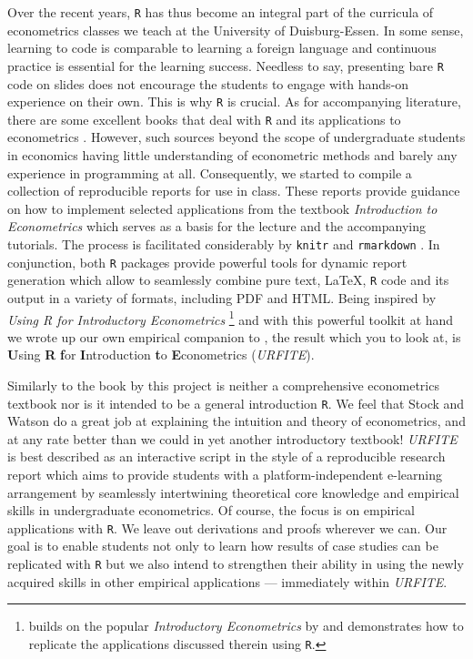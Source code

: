 \documentclass[]{book}
\let\rmarkdownfootnote\footnote%
\def\footnote{\protect\rmarkdownfootnote}
\theoremstyle{definition}
\theoremstyle{definition}
\theoremstyle{definition}
\theoremstyle{remark}
\begin{document}
Over the recent years, \texttt{R} has thus become an integral part of
the curricula of econometrics classes we teach at the University of
Duisburg-Essen. In some sense, learning to code is comparable to
learning a foreign language and continuous practice is essential for the
learning success. Needless to say, presenting bare \texttt{R} code on
slides does not encourage the students to engage with hands-on
experience on their own. This is why \texttt{R} is crucial. As for
accompanying literature, there are some excellent books that deal with
\texttt{R} and its applications to econometrics
\citep[e.g.][]{kleiber2008}. However, such sources beyond the scope of
undergraduate students in economics having little understanding of
econometric methods and barely any experience in programming at all.
Consequently, we started to compile a collection of reproducible reports
for use in class. These reports provide guidance on how to implement
selected applications from the textbook \emph{Introduction to
Econometrics} \citep{stock2015} which serves as a basis for the lecture
and the accompanying tutorials. The process is facilitated considerably
by \texttt{knitr} \citep{R-knitr} and \texttt{rmarkdown}
\citep{R-rmarkdown}. In conjunction, both \texttt{R} packages provide
powerful tools for dynamic report generation which allow to seamlessly
combine pure text, LaTeX, \texttt{R} code and its output in a variety of
formats, including PDF and HTML. Being inspired by \emph{Using R for
Introductory Econometrics} \citep{heiss2016}\footnote{\citet{heiss2016}
  builds on the popular \emph{Introductory Econometrics} by
  \citet{wooldridge2016} and demonstrates how to replicate the
  applications discussed therein using \texttt{R}.} and with this
powerful toolkit at hand we wrote up our own empirical companion to
\citet{stock2015}, the result which you to look at, is \textbf{U}sing
\textbf{R} \textbf{f}or \textbf{I}ntroduction \textbf{t}o
\textbf{E}conometrics (\emph{URFITE}).

Similarly to the book by \citet{heiss2016} this project is neither a
comprehensive econometrics textbook nor is it intended to be a general
introduction \texttt{R}. We feel that Stock and Watson do a great job at
explaining the intuition and theory of econometrics, and at any rate
better than we could in yet another introductory textbook! \emph{URFITE}
is best described as an interactive script in the style of a
reproducible research report which aims to provide students with a
platform-independent e-learning arrangement by seamlessly intertwining
theoretical core knowledge and empirical skills in undergraduate
econometrics. Of course, the focus is on empirical applications with
\texttt{R}. We leave out derivations and proofs wherever we can. Our
goal is to enable students not only to learn how results of case studies
can be replicated with \texttt{R} but we also intend to strengthen their
ability in using the newly acquired skills in other empirical
applications --- immediately within \emph{URFITE}.
\end{document}

